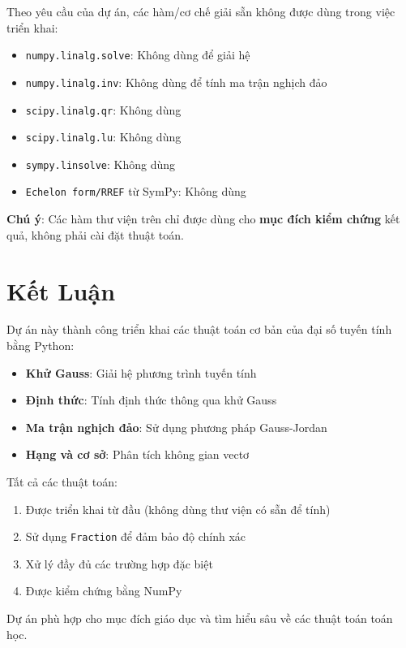 \documentclass[12pt, a4paper, twoside]{article}
\begin{document}
Theo yêu cầu của dự án, các hàm/cơ chế giải sẵn không được dùng trong việc triển khai:

\begin{itemize}
    \item \texttt{numpy.linalg.solve}: Không dùng để giải hệ
    \item \texttt{numpy.linalg.inv}: Không dùng để tính ma trận nghịch đảo
    \item \texttt{scipy.linalg.qr}: Không dùng
    \item \texttt{scipy.linalg.lu}: Không dùng
    \item \texttt{sympy.linsolve}: Không dùng
    \item \texttt{Echelon form/RREF} từ SymPy: Không dùng
\end{itemize}

\textbf{Chú ý}: Các hàm thư viện trên chỉ được dùng cho \textbf{mục đích kiểm chứng} kết quả, không phải cài đặt thuật toán.

\newpage

\section{Kết Luận}

Dự án này thành công triển khai các thuật toán cơ bản của đại số tuyến tính bằng Python:

\begin{itemize}
    \item \textbf{Khử Gauss}: Giải hệ phương trình tuyến tính
    \item \textbf{Định thức}: Tính định thức thông qua khử Gauss
    \item \textbf{Ma trận nghịch đảo}: Sử dụng phương pháp Gauss-Jordan
    \item \textbf{Hạng và cơ sở}: Phân tích không gian vectơ
\end{itemize}

Tất cả các thuật toán:
\begin{enumerate}
    \item Được triển khai từ đầu (không dùng thư viện có sẵn để tính)
    \item Sử dụng \texttt{Fraction} để đảm bảo độ chính xác
    \item Xử lý đầy đủ các trường hợp đặc biệt
    \item Được kiểm chứng bằng NumPy
\end{enumerate}

Dự án phù hợp cho mục đích giáo dục và tìm hiểu sâu về các thuật toán toán học.
\end{document}
